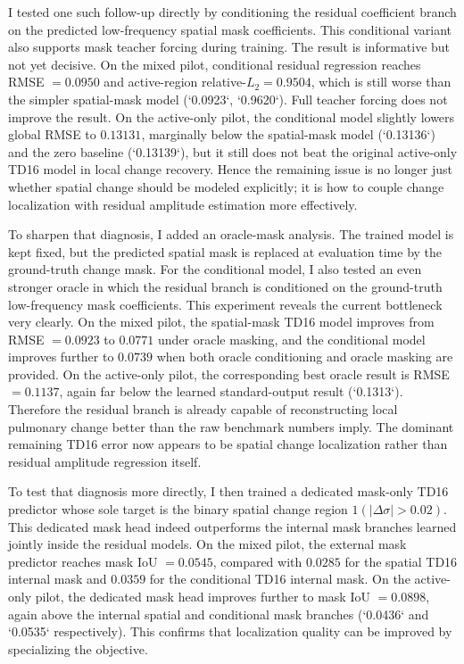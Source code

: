 \documentclass[11pt,a4paper]{article}
\begin{document}
I tested one such follow-up directly by conditioning the residual coefficient
branch on the predicted low-frequency spatial mask coefficients. This
conditional variant also supports mask teacher forcing during training. The
result is informative but not yet decisive. On the mixed pilot, conditional
residual regression reaches RMSE $= 0.0950$ and active-region
relative-$L_2 = 0.9504$, which is still worse than the simpler spatial-mask
model (`0.0923`, `0.9620`). Full teacher forcing does not improve the result.
On the active-only pilot, the conditional model slightly lowers global RMSE to
$0.13131$, marginally below the spatial-mask model (`0.13136`) and the zero
baseline (`0.13139`), but it still does not beat the original active-only TD16
model in local change recovery. Hence the remaining issue is no longer just
whether spatial change should be modeled explicitly; it is how to couple change
localization with residual amplitude estimation more effectively.

To sharpen that diagnosis, I added an oracle-mask analysis. The trained model is
kept fixed, but the predicted spatial mask is replaced at evaluation time by
the ground-truth change mask. For the conditional model, I also tested an even
stronger oracle in which the residual branch is conditioned on the ground-truth
low-frequency mask coefficients. This experiment reveals the current bottleneck
very clearly. On the mixed pilot, the spatial-mask TD16 model improves from
RMSE $= 0.0923$ to $0.0771$ under oracle masking, and the conditional model
improves further to $0.0739$ when both oracle conditioning and oracle masking
are provided. On the active-only pilot, the corresponding best oracle result is
RMSE $= 0.1137$, again far below the learned standard-output result
(`0.1313`). Therefore the residual branch is already capable of reconstructing
local pulmonary change better than the raw benchmark numbers imply. The
dominant remaining TD16 error now appears to be spatial change localization
rather than residual amplitude regression itself.

To test that diagnosis more directly, I then trained a dedicated mask-only TD16
predictor whose sole target is the binary spatial change region
$1(|\Delta \sigma| > 0.02)$. This dedicated mask head indeed outperforms the
internal mask branches learned jointly inside the residual models. On the mixed
pilot, the external mask predictor reaches mask IoU $= 0.0545$, compared with
$0.0285$ for the spatial TD16 internal mask and $0.0359$ for the conditional
TD16 internal mask. On the active-only pilot, the dedicated mask head improves
further to mask IoU $= 0.0898$, again above the internal spatial and conditional
mask branches (`0.0436` and `0.0535` respectively). This confirms that
localization quality can be improved by specializing the objective.
\end{document}
